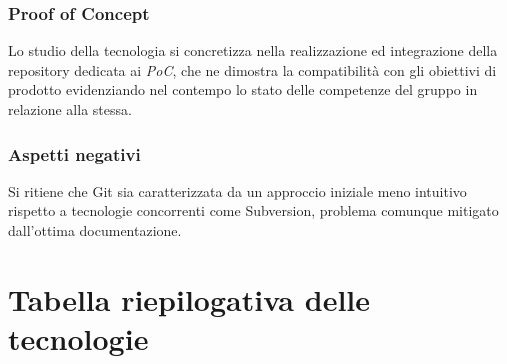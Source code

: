 \documentclass[./../Technology Baseline.tex]{subfiles}
\begin{document}
\subsubsection{Proof of Concept}
Lo studio della tecnologia si concretizza nella realizzazione ed integrazione della repository dedicata ai \textit{PoC}, che ne dimostra la compatibilità con gli obiettivi di prodotto evidenziando nel contempo lo stato delle competenze del gruppo in relazione alla stessa.
\subsubsection{Aspetti negativi}
Si ritiene che Git sia caratterizzata da un approccio iniziale meno intuitivo rispetto a tecnologie concorrenti come Subversion, problema comunque mitigato dall'ottima documentazione.

\section{Tabella riepilogativa delle tecnologie}
\end{document}
